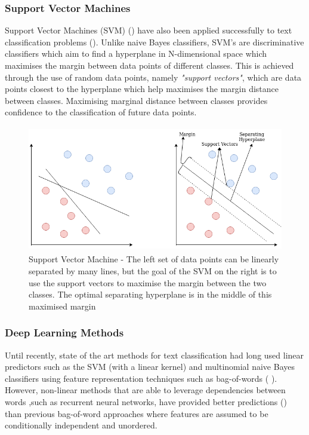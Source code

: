 \subsubsection{Support Vector Machines}
Support Vector Machines (SVM) (\cite{Cortes1995}) have also been applied successfully to text classification problems (\cite{Joachims1998}). Unlike naive Bayes classifiers, SVM's are discriminative classifiers which aim to find a hyperplane in N-dimensional space which maximises the margin between data points of different classes. This is achieved through the use of random data points, namely \textit{"support vectors"}, which are data points closest to the hyperplane which help maximises the margin distance between classes. Maximising marginal distance between classes provides confidence to the classification of future data points.

\noindent
\newline 
\begin{figure}[ht]
	\includegraphics[width=12cm, height=5.5cm]{./figures/fig17}
	\centering
	\caption[Support Vector Machine]{Support Vector Machine - The left set of data points can be linearly separated by many lines, but the goal of the SVM on the right is to use the support vectors to maximise the margin between the two classes. The optimal separating hyperplane is in the middle of this maximised margin}
	\label{fig:fig17}
\end{figure}

\subsubsection{Deep Learning Methods}
Until recently, state of the art methods for text classification had long used linear predictors such as the SVM (with a linear kernel) and multinomial naive Bayes classifiers using feature representation techniques such as bag-of-words (\cite{Joachims1998} \cite{Lewis2004}). However, non-linear methods that are able to leverage dependencies between words ,such as recurrent neural networks, have provided better predictions (\cite{Dai2015a}) than previous bag-of-word approaches where features are assumed to be conditionally independent and unordered.